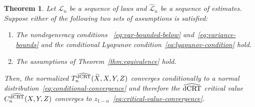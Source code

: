 \documentclass[aos]{imsart}
\theoremstyle{plain}
\newtheorem{theorem}{Theorem}
\theoremstyle{remark}
\newcommand{\srx}{X}									%
\newcommand{\srz}{Z}									%
\newcommand{\srxk}{\widetilde X}						%
\newcommand{\sry}{Y}									%
\newcommand{\law}{\mathcal L}							%
\newcommand{\lawhat}{\widehat{\mathcal L}}				%
\newcommand{\dCRThat}{\widehat{\textnormal{dCRT}}}		%
\begin{document}
\begin{theorem} \label{thm:normal-limit-stronger}
	Let $\law_n$ be a sequence of laws and $\lawhat_n$ be a sequence of estimates. Suppose either of the following two sets of assumptions is satisfied: 
	\begin{enumerate}
		\item The nondegeneracy conditions ~\eqref{eq:var-bounded-below} and~\eqref{eq:variance-bounds} and the conditional Lyapunov condition~\eqref{eq:lyapunov-condition} hold.
		\item The assumptions of Theorem~\ref{thm:equivalence} hold.
	\end{enumerate}
	Then, the normalized $T_n^{\dCRThat}(\srxk, \srx, \sry, \srz)$ converges conditionally to a normal distribution~\eqref{eq:conditional-convergence} and therefore the $\dCRThat$ critical value $C^{\dCRThat}_n(\srx, \sry, \srz)$ converges to $z_{1-\alpha}$~\eqref{eq:critical-value-convergence}.
\end{theorem}
\end{document}

